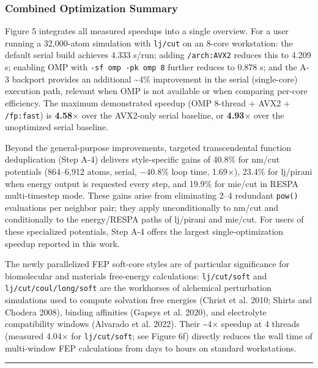 \documentclass[
  11pt,
]{article}
\begin{document}
\subsubsection{Combined Optimization
Summary}\label{combined-optimization-summary}

Figure 5 integrates all measured speedups into a single overview. For a
user running a 32,000-atom simulation with \texttt{lj/cut} on an 8-core
workstation: the default serial build achieves 4.333 s/run; adding
\texttt{/arch:AVX2} reduces this to 4.209 s; enabling OMP with
\texttt{-sf\ omp\ -pk\ omp\ 8} further reduces to 0.878 s; and the A-3
backport provides an additional \textasciitilde4\% improvement in the
serial (single-core) execution path, relevant when OMP is not available
or when comparing per-core efficiency. The maximum demonstrated speedup
(OMP 8-thread + AVX2 + \texttt{/fp:fast}) is \textbf{4.58\(\times\)}
over the AVX2-only serial baseline, or \textbf{4.93\(\times\)} over the
unoptimized serial baseline.

Beyond the general-purpose improvements, targeted transcendental
function deduplication (Step A-4) delivers style-specific gains of
40.8\% for nm/cut potentials (864--6,912 atoms, serial, −40.8\% loop
time, 1.69\(\times\)), 23.4\% for lj/pirani when energy output is
requested every step, and 19.9\% for mie/cut in RESPA multi-timestep
mode. These gains arise from eliminating 2--4 redundant \texttt{pow()}
evaluations per neighbor pair; they apply unconditionally to nm/cut and
conditionally to the energy/RESPA paths of lj/pirani and mie/cut. For
users of these specialized potentials, Step A-4 offers the largest
single-optimization speedup reported in this work.

The newly parallelized FEP soft-core styles are of particular
significance for biomolecular and materials free-energy calculations:
\texttt{lj/cut/soft} and \texttt{lj/cut/coul/long/soft} are the
workhorses of alchemical perturbation simulations used to compute
solvation free energies (Christ et al. 2010; Shirts and Chodera 2008),
binding affinities ({Gapsys et al.} 2020), and electrolyte compatibility
windows ({Alvarado et al.} 2022). Their \textasciitilde4\(\times\)
speedup at 4 threads (measured 4.04\(\times\) for \texttt{lj/cut/soft};
see Figure 6f) directly reduces the wall time of multi-window FEP
calculations from days to hours on standard workstations.

\begin{center}\rule{0.5\linewidth}{0.5pt}\end{center}
\end{document}
